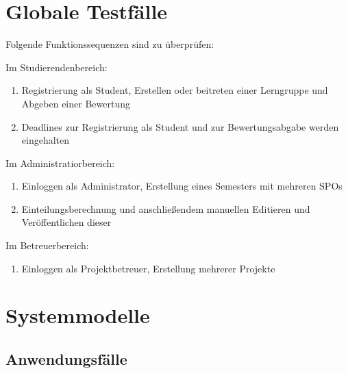 \documentclass[parskip=full]{scrartcl}
\newcommand{\swtLabel}[1]{\textbf{/#1\arabic*0/}}
\begin{document}
\section{Globale Testfälle}
Folgende Funktionssequenzen sind zu überprüfen:

Im Studierendenbereich:


\begin{enumerate} [label=\swtLabel{T}]
  
  
  \item Registrierung als Student, Erstellen oder beitreten einer  \gls{Lerngruppe} und Abgeben einer Bewertung
  \item Deadlines zur Registrierung als Student und zur Bewertungsabgabe werden eingehalten

\end{enumerate}
Im Administratiorbereich:
   \begin{enumerate} [label=\swtLabel{T}, resume]
  \item Einloggen als Administrator, Erstellung eines Semesters mit mehreren SPOs
  \item Einteilungsberechnung und anschließendem manuellen Editieren und
  Veröffentlichen dieser
\end{enumerate}
  Im Betreuerbereich:
   \begin{enumerate} [label=\swtLabel{T}, resume]
  \item Einloggen als Projektbetreuer, Erstellung mehrerer Projekte
\end{enumerate}



\section{Systemmodelle}

\subsection{Anwendungsfälle}
\end{document}
